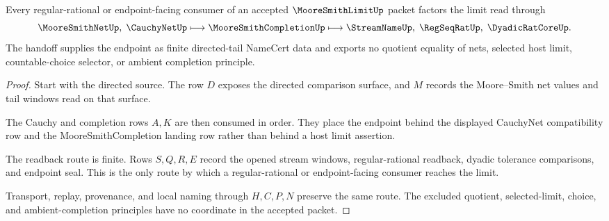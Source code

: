 \begin{theorem}
\label{thm:moore-smith-limit-regseqrat-handoff}
Every regular-rational or endpoint-facing consumer of an accepted $\MooreSmithLimitUp$ packet factors the limit read through
$$
\MooreSmithNetUp,\;\CauchyNetUp
\longmapsto
\MooreSmithCompletionUp
\longmapsto
\StreamNameUp,\;\RegSeqRatUp,\;\DyadicRatCoreUp .
$$
The handoff supplies the endpoint as finite directed-tail NameCert data and exports no quotient equality of nets, selected host limit, countable-choice selector, or ambient completion principle.
\end{theorem}
\begin{proof}
Start with the directed source. The row $D$ exposes the directed comparison surface, and $M$ records the Moore--Smith net values and tail windows read on that surface.

The Cauchy and completion rows $A,K$ are then consumed in order. They place the endpoint behind the displayed CauchyNet compatibility row and the MooreSmithCompletion landing row rather than behind a host limit assertion.

The readback route is finite. Rows $S,Q,R,E$ record the opened stream windows, regular-rational readback, dyadic tolerance comparisons, and endpoint seal. This is the only route by which a regular-rational or endpoint-facing consumer reaches the limit.

Transport, replay, provenance, and local naming through $H,C,P,N$ preserve the same route. The excluded quotient, selected-limit, choice, and ambient-completion principles have no coordinate in the accepted packet.
\end{proof}


\begin{closurestatus}{\MooreSmithLimitUp}
  \theoryclosure{\seedClosure}
  \formalstatus{\unformalizedV}
\end{closurestatus}
